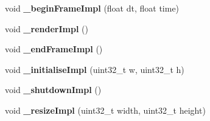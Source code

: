 \begin{DoxyCompactItemize}
\item 
\hypertarget{class_verdi_1_1_ray_cast_strategy_a2dd5ae69abee90140d21f7446b6d0a64}{void {\bfseries \-\_\-begin\-Frame\-Impl} (float dt, float time)}\label{class_verdi_1_1_ray_cast_strategy_a2dd5ae69abee90140d21f7446b6d0a64}

\item 
\hypertarget{class_verdi_1_1_ray_cast_strategy_a35873ac8b5be63739744bd23eeeaceac}{void {\bfseries \-\_\-render\-Impl} ()}\label{class_verdi_1_1_ray_cast_strategy_a35873ac8b5be63739744bd23eeeaceac}

\item 
\hypertarget{class_verdi_1_1_ray_cast_strategy_ae0d8b3acca3a1de0804f3544b744c3a1}{void {\bfseries \-\_\-end\-Frame\-Impl} ()}\label{class_verdi_1_1_ray_cast_strategy_ae0d8b3acca3a1de0804f3544b744c3a1}

\item 
\hypertarget{class_verdi_1_1_ray_cast_strategy_a59c9051f6b006206c2cb109619f35d27}{void {\bfseries \-\_\-initialise\-Impl} (uint32\-\_\-t w, uint32\-\_\-t h)}\label{class_verdi_1_1_ray_cast_strategy_a59c9051f6b006206c2cb109619f35d27}

\item 
\hypertarget{class_verdi_1_1_ray_cast_strategy_acba12a8f4de9b6ceef427f736af016b5}{void {\bfseries \-\_\-shutdown\-Impl} ()}\label{class_verdi_1_1_ray_cast_strategy_acba12a8f4de9b6ceef427f736af016b5}

\item 
\hypertarget{class_verdi_1_1_ray_cast_strategy_a5031464575a3d3e6db2c633e46071105}{void {\bfseries \-\_\-resize\-Impl} (uint32\-\_\-t width, uint32\-\_\-t height)}\label{class_verdi_1_1_ray_cast_strategy_a5031464575a3d3e6db2c633e46071105}

\end{DoxyCompactItemize}
